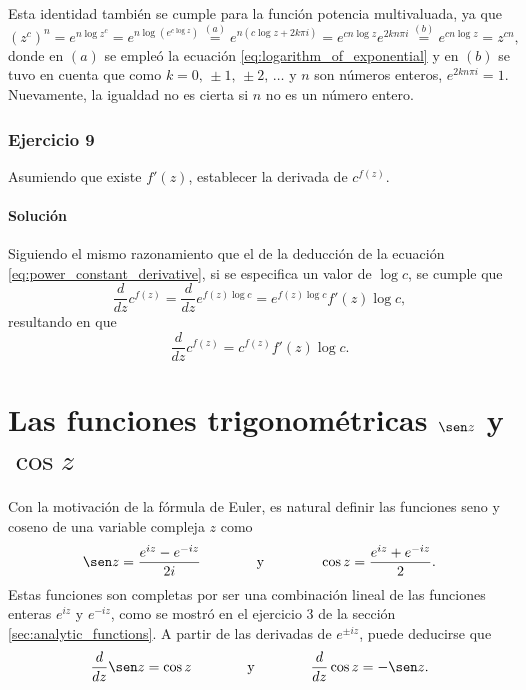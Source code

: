 \documentclass[a4paper]{report}
\begin{document}
\begin{enumerate}
 Esta identidad también se cumple para la función potencia multivaluada, ya que 
 \[
  (z^c)^n=e^{n\log z^c}=e^{n\log(e^{c\log z})}\overset{(a)}{=}e^{n(c\log z+2k\pi i)}
  =e^{cn\log z}e^{2kn\pi i}\overset{(b)}{=}e^{cn\log z}=z^{cn},
 \]
 donde en \((a)\) se empleó la ecuación  \ref{eq:logarithm_of_exponential} y en \((b)\) se tuvo en cuenta que como \(k=0,\,\pm1,\,\pm2,\,\dots\) y \(n\) son números enteros, \(e^{2kn\pi i}=1\). Nuevamente, la igualdad no es cierta si \(n\) no es un número entero.
\end{enumerate}
 
\subsubsection{Ejercicio 9}

Asumiendo que existe \(f'(z)\), establecer la derivada de \(c^{f(z)}\). 

\paragraph{Solución} Siguiendo el mismo razonamiento que el de la deducción de la ecuación \ref{eq:power_constant_derivative}, si se especifica un valor de \(\log c\), se cumple que 
\[
 \frac{d}{dz}c^{f(z)}=\frac{d}{dz}e^{f(z)\log c}=e^{f(z)\log c}f'(z)\log c,
\]
resultando en que 
\[
 \frac{d}{dz}c^{f(z)}=c^{f(z)}f'(z)\log c.
\]

\section{Las funciones trigonométricas \texorpdfstring{\(\sen z\)}{sen z} y \texorpdfstring{\(\cos z\)}{cos z}}\label{sec:trigonometric_functions_sin_and_cos}

Con la motivación de la fórmula de Euler, es natural definir las funciones seno y coseno de una variable compleja \(z\) como
\begin{equation}\label{eq:sin_and_cosine_definition}
 \sen z=\frac{e^{iz}-e^{-iz}}{2i}
 \qquad\qquad\textrm{y}\qquad\qquad 
 \cos z=\frac{e^{iz}+e^{-iz}}{2}. 
\end{equation}
Estas funciones son completas por ser una combinación lineal de las funciones enteras \(e^{iz}\) y \(e^{-iz}\), como se mostró en el ejercicio 3 de la sección \ref{sec:analytic_functions}. A partir de las derivadas de \(e^{\pm iz}\), puede deducirse que
\begin{equation}\label{eq:sin_and_cosine_derivatives}
 \frac{d}{dz}\sen z=\cos z
 \qquad\qquad\textrm{y}\qquad\qquad 
 \frac{d}{dz}\cos z=-\sen z. 
\end{equation}
\end{document}
